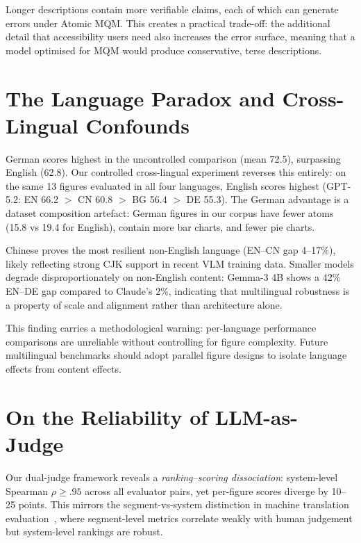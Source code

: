 Longer descriptions contain more verifiable claims, each of which can generate errors under Atomic MQM.
This creates a practical trade-off: the additional detail that accessibility users need also increases the error surface, meaning that a model optimised for MQM would produce conservative, terse descriptions.

\section{The Language Paradox and Cross-Lingual Confounds}\label{sec:disc-language}

German scores highest in the uncontrolled comparison (mean 72.5), surpassing English (62.8).
Our controlled cross-lingual experiment reverses this entirely: on the same 13 figures evaluated in all four languages, English scores highest (GPT-5.2: EN 66.2 $>$ CN 60.8 $>$ BG 56.4 $>$ DE 55.3).
The German advantage is a dataset composition artefact: German figures in our corpus have fewer atoms (15.8 vs 19.4 for English), contain more bar charts, and fewer pie charts.

Chinese proves the most resilient non-English language (EN--CN gap 4--17\%), likely reflecting strong CJK support in recent VLM training data.
Smaller models degrade disproportionately on non-English content: Gemma-3 4B shows a 42\% EN--DE gap compared to Claude's 2\%, indicating that multilingual robustness is a property of scale and alignment rather than architecture alone.

This finding carries a methodological warning: per-language performance comparisons are unreliable without controlling for figure complexity.
Future multilingual benchmarks should adopt parallel figure designs to isolate language effects from content effects.

\section{On the Reliability of LLM-as-Judge}\label{sec:disc-judge}

Our dual-judge framework reveals a \emph{ranking--scoring dissociation}: system-level Spearman $\rho \geq .95$ across all evaluator pairs, yet per-figure scores diverge by 10--25 points.
This mirrors the segment-vs-system distinction in machine translation evaluation~\citep{freitag2021experts}, where segment-level metrics correlate weakly with human judgement but system-level rankings are robust.

